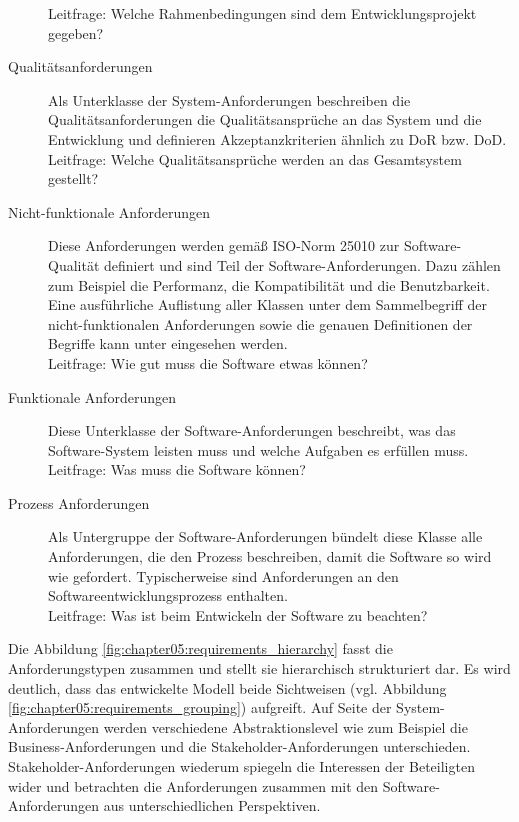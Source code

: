\begin{description}
  Leitfrage: \glqq Welche Rahmenbedingungen sind dem Entwicklungsprojekt gegeben? \grqq
  \item[Qualitätsanforderungen] Als Unterklasse der System-Anforderungen beschreiben die Qualitätsanforderungen die Qualitätsansprüche an das System und die Entwicklung und definieren Akzeptanzkriterien ähnlich zu \ac{DoR} bzw. \ac{DoD}.\\
  Leitfrage: \glqq Welche Qualitätsansprüche werden an das Gesamtsystem gestellt? \grqq
  \item[Nicht-funktionale Anforderungen] Diese Anforderungen werden gemäß \ac{ISO}-Norm 25010 zur Software-Qualität definiert und sind Teil der Software-Anforderungen. Dazu zählen zum Beispiel die Performanz, die Kompatibilität und die Benutzbarkeit. Eine ausführliche Auflistung aller Klassen unter dem Sammelbegriff der nicht-funktionalen Anforderungen sowie die genauen Definitionen der Begriffe kann unter \cite{ISO25010} eingesehen werden.\\
  Leitfrage: \glqq Wie gut muss die Software etwas können? \grqq
  \item[Funktionale Anforderungen] Diese Unterklasse der Software-Anforderungen beschreibt, was das Software-System leisten muss und welche Aufgaben es erfüllen muss.\\
  Leitfrage: \glqq Was muss die Software können? \grqq
  \item[Prozess Anforderungen] Als Untergruppe der Software-Anforderungen bündelt diese Klasse alle Anforderungen, die den Prozess beschreiben, damit die Software so wird wie gefordert. Typischerweise sind Anforderungen an den Softwareentwicklungsprozess enthalten.\\
  Leitfrage: \glqq Was ist beim Entwickeln der Software zu beachten? \grqq
  \end{description}

Die Abbildung \ref{fig:chapter05:requirements_hierarchy} fasst die Anforderungstypen zusammen und stellt sie hierarchisch strukturiert dar. Es wird deutlich, dass das entwickelte Modell beide Sichtweisen (vgl. Abbildung \ref{fig:chapter05:requirements_grouping}) aufgreift. Auf Seite der System-Anforderungen werden verschiedene Abstraktionslevel wie zum Beispiel die Business-Anforderungen und die Stakeholder-Anforderungen unterschieden. Stakeholder-Anforderungen wiederum spiegeln die Interessen der Beteiligten wider und betrachten die Anforderungen zusammen mit den Software-Anforderungen aus unterschiedlichen Perspektiven.

